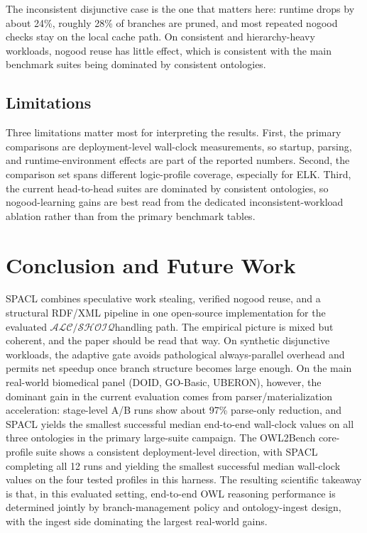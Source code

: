 \documentclass[preprint,12pt,times]{elsarticle}
\newcommand{\dlfrag}{\ensuremath{\mathcal{ALC/SHOIQ}}}
\begin{document}
The inconsistent disjunctive case is the one that matters here: runtime drops by about 24\%, roughly 28\% of branches are pruned, and most repeated nogood checks stay on the local cache path. On consistent and hierarchy-heavy workloads, nogood reuse has little effect, which is consistent with the main benchmark suites being dominated by consistent ontologies.

\subsection{Limitations}
\label{sec:limitations}

Three limitations matter most for interpreting the results. First, the primary comparisons are deployment-level wall-clock measurements, so startup, parsing, and runtime-environment effects are part of the reported numbers. Second, the comparison set spans different logic-profile coverage, especially for ELK. Third, the current head-to-head suites are dominated by consistent ontologies, so nogood-learning gains are best read from the dedicated inconsistent-workload ablation rather than from the primary benchmark tables.

\section{Conclusion and Future Work}
\label{sec:conclusion}

SPACL combines speculative work stealing, verified nogood reuse, and a structural RDF/XML pipeline in one open-source implementation for the evaluated \dlfrag handling path. The empirical picture is mixed but coherent, and the paper should be read that way. On synthetic disjunctive workloads, the adaptive gate avoids pathological always-parallel overhead and permits net speedup once branch structure becomes large enough. On the main real-world biomedical panel (DOID, GO-Basic, UBERON), however, the dominant gain in the current evaluation comes from parser/materialization acceleration: stage-level A/B runs show about 97\% parse-only reduction, and SPACL yields the smallest successful median end-to-end wall-clock values on all three ontologies in the primary large-suite campaign. The OWL2Bench core-profile suite shows a consistent deployment-level direction, with SPACL completing all 12 runs and yielding the smallest successful median wall-clock values on the four tested profiles in this harness. The resulting scientific takeaway is that, in this evaluated setting, end-to-end OWL reasoning performance is determined jointly by branch-management policy and ontology-ingest design, with the ingest side dominating the largest real-world gains.
\end{document}
